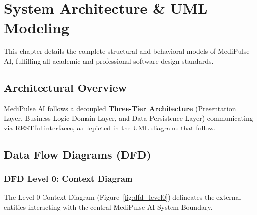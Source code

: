 \documentclass[11pt,a4paper]{article}
\begin{document}
\section{System Architecture \& UML Modeling}
This chapter details the complete structural and behavioral models of MediPulse AI, fulfilling all academic and professional software design standards.

\subsection{Architectural Overview}
MediPulse AI follows a decoupled \textbf{Three-Tier Architecture} (Presentation Layer, Business Logic Domain Layer, and Data Persistence Layer) communicating via RESTful interfaces, as depicted in the UML diagrams that follow.

\subsection{Data Flow Diagrams (DFD)}

\subsubsection{DFD Level 0: Context Diagram}
The Level 0 Context Diagram (Figure~\ref{fig:dfd_level0}) delineates the external entities interacting with the central MediPulse AI System Boundary.
\end{document}
